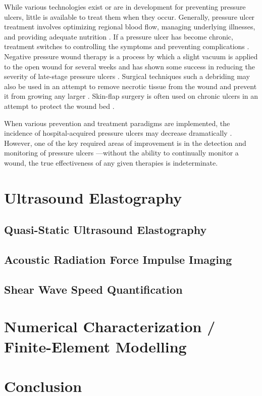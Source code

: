 			While various technologies exist or are in development for preventing pressure ulcers, little is available to treat them when they occur. Generally, pressure ulcer treatment involves optimizing regional blood flow, managing underlying illnesses, and providing adequate nutrition \cite{jaul10}. If a pressure ulcer has become chronic, treatment switches to controlling the symptoms and preventing complications \cite{jaul10}. Negative pressure wound therapy is a process by which a slight vacuum is applied to the open wound for several weeks and has shown some success in reducing the severity of late-stage pressure ulcers \cite{greer13}. Surgical techniques such a debriding may also be used in an attempt to remove necrotic tissue from the wound and prevent it from growing any larger \cite{longe86,brem02}. Skin-flap surgery is often used on chronic ulcers in an attempt to protect the wound bed \cite{biglari14}.

			When various prevention and treatment paradigms are implemented, the incidence of hospital-acquired pressure ulcers may decrease dramatically \cite{bales11,thompson11,carson11}. However, one of the key required areas of improvement is in the detection and monitoring of pressure ulcers \cite{milne09}---without the ability to continually monitor a wound, the true effectiveness of any given therapies is indeterminate.

	\section{Ultrasound Elastography}

		\subsection{Quasi-Static Ultrasound Elastography}

		\subsection{Acoustic Radiation Force Impulse Imaging}

		\subsection{Shear Wave Speed Quantification}

	\section{Numerical Characterization / Finite-Element Modelling}

	\section{Conclusion}

	\cleardoublepage


	\printbibliography[heading=subbibliography]